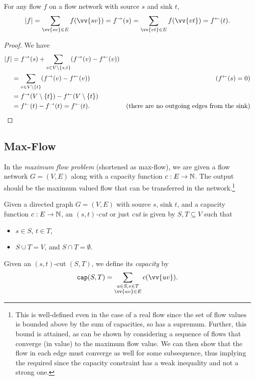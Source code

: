 	\begin{lemma}
		For any flow $f$ on a flow network with source $s$ and sink $t$,
		\[ |f| = \sum_{\vv{sv}\in E}f(\vv{sv}) = f^{\to}(s) = \sum_{\vv{vt}\in E}f(\vv{vt}) = f^{\ot}(t). \]
	\end{lemma}
	\begin{proof}
		We have
		\begin{align*}
			|f| &= f^{\to}(s) + \sum_{v\in V\setminus\{s,t\}} (f^\to(v) - f^\leftarrow(v)) \\
				&= \sum_{v\in V\setminus \{t\}} (f^\to(v) - f^\leftarrow(v)) & (f^\leftarrow(s)=0) \\
				&= f^\to(V\setminus\{t\}) - f^\leftarrow(V\setminus\{t\}) \\
				&= f^\leftarrow(t) - f^\to(t) = f^\leftarrow(t). & (\text{there are no outgoing edges from the sink})
		\end{align*}
	\end{proof}

\subsection{Max-Flow}

	In the \textit{maximum flow problem} (shortened as max-flow), we are given a flow network $G=(V,E)$ along with a capacity function $c:E\to\mathbb{N}$. The output should be the maximum valued flow that can be transferred in the network.\footnote{This is well-defined even in the case of a real flow since the set of flow values is bounded above by the sum of capacities, so has a supremum. Further, this bound is attained, as can be shown by considering a sequence of flows that converge (in value) to the maximum flow value. We can then show that the flow in each edge must converge as well for some subsequence, thus implying the required since the capacity constraint has a weak inequality and not a strong one.}

	\begin{fdef}
		Given a directed graph $G=(V,E)$ with source $s$, sink $t$, and a capacity function $c:E\to\mathbb{N}$, an \textit{$(s,t)$-cut} or just \textit{cut} is given by $S,T\subseteq V$ such that
		\begin{itemize}
			\item $s\in S$, $t\in T$,
			\item $S\cup T=V$, and $S\cap T=\emptyset$.
		\end{itemize}
		Given an $(s,t)$-cut $(S,T)$, we define its \textit{capacity} by
		\[ \capp(S,T) = \sum_{\substack{u\in S, v\in T \\ \vv{uv}\in E}} c(\vv{uv}). \]
	\end{fdef}

